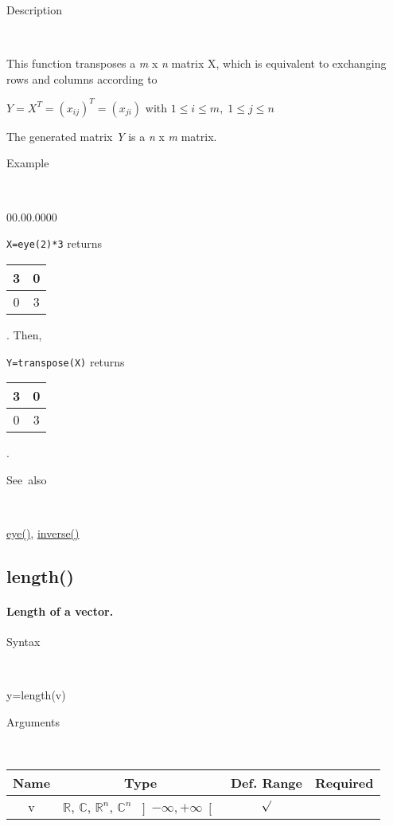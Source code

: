 \begin{description}
\item [Description]~
\end{description}
This function transposes a \textit{m} x \textit{n} matrix X, which
is equivalent to exchanging rows and columns according to

\medskip{}
$Y=X^{T}=\left(x_{ij}\right)^{T}=\left(x_{ji}\right)$ with $1\leq i\leq m,\;1\leq j\leq n$
\medskip{}

The generated matrix \textit{Y} is a \textit{n} x \textit{m}
matrix.

\begin{description}
\item [Example]~
\end{description}
\begin{lyxlist}{00.00.0000}
\item [\texttt{X=eye(2){*}3}]returns \begin{tabular}{|c|c|}
\hline 
3&
0\tabularnewline
\hline
0&
3\tabularnewline
\hline
\end{tabular}. Then,
\item [\texttt{Y=transpose(X)}]returns \begin{tabular}{|c|c|}
\hline 
3&
0\tabularnewline
\hline
0&
3\tabularnewline
\hline
\end{tabular}.
\end{lyxlist}
\begin{description}
\item [See~also]~
\end{description}
\textcolor{blue}{\hyperlink{eye}{eye()}}, \textcolor{blue}{\hyperlink{inverse}{inverse()}}


\newpage
\subsection*{\hypertarget{length}{}{\Large length()}}


\paragraph{\textmd{\label{par:Vector-length}}Length of a vector.}

\begin{description}
\item [Syntax]~
\end{description}
y=length(v)

\begin{description}
\item [Arguments]~
\end{description}
\begin{tabular}{|c|c|c|c|}
\hline 
Name&
Type&
Def. Range&
Required\tabularnewline
\hline
\hline 
v&
$\mathbb{R}$, $\mathbb{C}$, $\mathbb{R}^{n}$, $\mathbb{C}^{n}$
$\left]-\infty,+\infty\right[$&
$\surd$\tabularnewline
\hline
\end{tabular}

